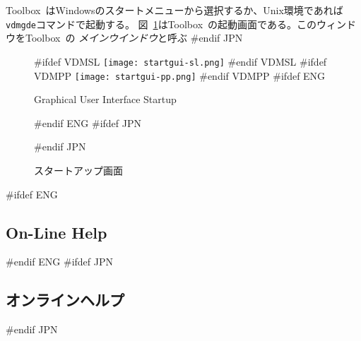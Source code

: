 \documentclass[\pformat,12pt]{article}
\newcommand{\Toolbox}{Toolbox}
\newcommand{\vdmgde}{vdmgde}
\newcommand{\Toolbox}{Toolbox}
\newcommand{\vdmgde}{vppgde}
\newcommand{\guicmd}[1]{{\sf #1}}
\newcommand{\guicmd}[1]{{\gt #1}}
\begin{document}
\Toolbox\ はWindowsのスタートメニューから選択するか、Unix環境であれば{\tt
  \vdmgde}コマンドで起動する。
図~\ref{fig:startgui}は\Toolbox\ の起動画面である。このウィンドウを\Toolbox\ の
{\em メインウインドウ\/}と呼ぶ
#endif JPN

\begin{figure}[tbh]
\begin{center}
#ifdef VDMSL
\texttt{[image: startgui-sl.png]}
#endif VDMSL
#ifdef VDMPP
\texttt{[image: startgui-pp.png]}
#endif VDMPP
#ifdef ENG
\caption{Graphical User Interface Startup}
#endif ENG
#ifdef JPN
\caption{スタートアップ画面}
#endif JPN
\label{fig:startgui}
\end{center}
\end{figure}

#ifdef ENG
\subsection{On-Line Help}
#endif ENG
#ifdef JPN
\subsection{オンラインヘルプ}
#endif JPN
 
%


\end{document}
